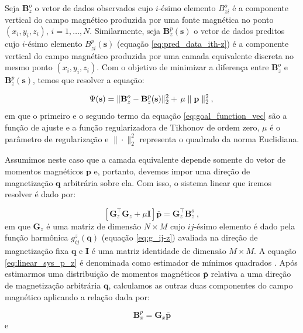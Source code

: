 Seja $\mathbf{B}_{z}^{o}$ o vetor de dados observados cujo $i$-ésimo elemento $B_{zi}^{o}$ é a componente vertical do campo magnético produzida por uma fonte magnética no ponto $(x_{i},y_{i},z_{i})$, $i = 1, \dots, N$. Similarmente, seja $\mathbf{B}_{z}^{p} (\mathbf{s})$ o vetor de dados preditos cujo $i$-ésimo elemento $B_{zi}^{p}(\mathbf{s})$ (equação \ref{eq:pred_data_ith-z}) é a componente vertical do campo magnético produzida por uma camada equivalente discreta no mesmo ponto $(x_{i},y_{i},z_{i})$. Com o objetivo de minimizar a diferença entre $\mathbf{B}_{z}^{o}$ e $\mathbf{B}_{z}^{p} (\mathbf{s})$, temos que resolver a equação:

\begin{equation}
\Psi(\mathbf{s}) =\lVert \mathbf{B}_{z}^{o} - \mathbf{B}_{z}^{p} (\mathbf{s}) 
	\rVert_{2}^{2} + \, \mu  \parallel \mathbf{p} \parallel_{2}^{2} \: , \\
\label{eq:goal_function_vec}
\end{equation}
em que o primeiro e o segundo termo da equação \ref{eq:goal_function_vec} são a função de ajuste e a função regularizadora de Tikhonov de ordem zero, $\mu$ é o parâmetro de regularização e $\| \cdot \|_{2}^{2}$ representa o quadrado da norma Euclidiana. 

Assumimos neste caso que a camada equivalente depende somente do vetor de momentos magnéticos $\mathbf{p}$ e, portanto, devemos impor uma direção de magnetização $\mathbf{q}$ arbitrária sobre ela. Com isso, o sistema linear que iremos resolver é dado por:

\begin{equation}
\left[ \mathbf{G}_{z}^{\top} \mathbf{G}_{z} + \mu \mathbf{I} \right] \bar{\mathbf{p}} = \mathbf{G}_{z}^{\top} \mathbf{B}_{z}^{o} \: ,
\label{eq:linear_sys_p_z}
\end{equation}
em que $\mathbf{G}_{z}$ é uma matriz de dimensão $N \times M$ cujo $ij$-ésimo elemento é dado pela função harmônica $g_{ij}^{z}(\mathbf{q})$ (equação \ref{eq:g_ij-z}) avaliada na direção de magnetização fixa $\mathbf{q}$ e $\mathbf{I}$ é uma matriz identidade de dimensão $M \times M$. A equação \ref{eq:linear_sys_p_z} é denominada como estimador de mínimos quadrados \citep{aster2005}. Após estimarmos uma distribuição de momentos magnéticos $\bar{\mathbf{p}}$ relativa a uma direção de magnetização arbitrária $\mathbf{q}$, calculamos as outras duas componentes do campo magnético aplicando a relação dada por:

\begin{equation}
\mathbf{B}_{x}^{p}  = \mathbf{G}_{x} \bar{\mathbf{p}}
\label{eq:pred_vec_x}
\end{equation}
e

